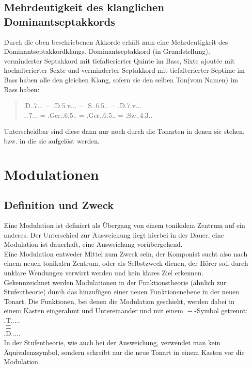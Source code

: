 \documentclass[a4paper]{article}
\newcommand{\dShoch}[4]{\HH.\uppercase\expandafter{\romannumeral #1\relax}..#2.#3.#4.} %
\newcommand{\bel}[5]{\HH.#1.#5.#2.#3.#4.}
\newcommand{\T}{\HH.T.....}
\newcommand{\D}{\HH.D.....}
\newcommand{\Dhoch}[2]{\HH.D.#2.#1...}
\begin{document}
	\subsection{Mehrdeutigkeit des klanglichen Dominantseptakkords}
	Durch die oben beschriebenen Akkorde erhält man eine Mehrdeutigkeit des Dominantseptakkordklangs. Dominantseptakkord (in Grundstellung), verminderter Septakkord mit tiefalterierter Quinte im Bass, Sixte ajoutée mit hochalterierter Sexte und verminderter Septakkord mit tiefalterierter Septime im Bass haben alle den gleichen Klang, sofern sie den selben Ton(vom Namen) im Bass haben:
	\begin{quotation}
		\Dhoch{7}{} = \Dhoch{v}{5\VM} = \bel{S}{6\UB}{5}{}{} = \Dhoch{v}{7\VM}\\
		\dShoch{5}{7}{}{} = \bel{Ger}{6}{5}{}{} = \bel{Ger}{6}{5}{}{} = \bel{Sw}{4}{3}{}{}
	\end{quotation}
	Unterscheidbar sind diese dann nur noch durch die Tonarten in denen sie stehen, bzw. in die sie aufgelöst werden.
	
	\section{Modulationen}
	\subsection{Definition und Zweck}
	Eine Modulation ist definiert als Übergang von einem tonikalem Zentrum auf ein anderes. Der Unterschied zur Ausweichung liegt hierbei in der Dauer, eine Modulation ist dauerhaft, eine Ausweichung vorübergehend.\\
	Eine Modulation entweder Mittel zum Zweck sein, der Komponist sucht also nach einem neuen tonikalen Zentrum, oder als Selbstzweck dienen, der Hörer soll durch unklare Wendungen verwirrt werden und kein klares Ziel erkennen.\\
	Gekennzeichnet werden Modulationen in der Funktionstheorie (ähnlich zur Stufentheorie) durch das hinzufügen einer neuen Funktionenebene in der neuen Tonart. Die Funktionen, bei denen die Modulation geschieht, werden dabei in einem Kasten eingerahmt und Untereinander und mit einem $\equiv$-Symbol getrennt:\\
	\T\\
	$\equiv$\\
	\D\\
	In der Stufentheorie, wie auch bei der Ausweichung, verwendet man kein Äquivalenzsymbol, sondern schreibt nur die neue Tonart in einem Kasten vor die Modulation.
\end{document}
